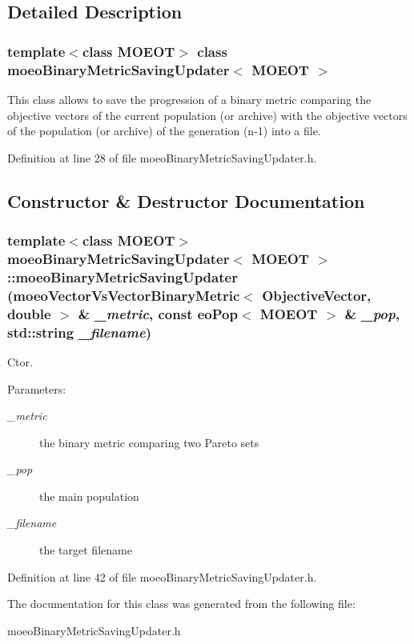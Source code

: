 \subsection{Detailed Description}
\subsubsection*{template$<$class MOEOT$>$ class moeo\-Binary\-Metric\-Saving\-Updater$<$ MOEOT $>$}

This class allows to save the progression of a binary metric comparing the objective vectors of the current population (or archive) with the objective vectors of the population (or archive) of the generation (n-1) into a file. 



Definition at line 28 of file moeo\-Binary\-Metric\-Saving\-Updater.h.

\subsection{Constructor \& Destructor Documentation}
\subsubsection{\setlength{\rightskip}{0pt plus 5cm}template$<$class MOEOT$>$ \bf{moeo\-Binary\-Metric\-Saving\-Updater}$<$ MOEOT $>$::\bf{moeo\-Binary\-Metric\-Saving\-Updater} (\bf{moeo\-Vector\-Vs\-Vector\-Binary\-Metric}$<$ \bf{Objective\-Vector}, double $>$ \& {\em \_\-metric}, const \bf{eo\-Pop}$<$ MOEOT $>$ \& {\em \_\-pop}, std::string {\em \_\-filename})\hspace{0.3cm}{\tt  [inline]}}\label{classmoeoBinaryMetricSavingUpdater_b7c3fb73caf759450367c76d4716bb62}


Ctor. 

\begin{Desc}
\item[Parameters:]
\begin{description}
\item[{\em \_\-metric}]the binary metric comparing two Pareto sets \item[{\em \_\-pop}]the main population \item[{\em \_\-filename}]the target filename \end{description}
\end{Desc}


Definition at line 42 of file moeo\-Binary\-Metric\-Saving\-Updater.h.

The documentation for this class was generated from the following file:\begin{CompactItemize}
\item 
moeo\-Binary\-Metric\-Saving\-Updater.h\end{CompactItemize}
